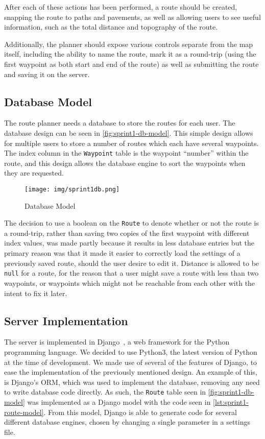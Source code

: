 After each of these actions has been performed, a route should be created, snapping the route to paths and pavements, as well as allowing users to see useful information, such as the total distance and topography of the route.

Additionally, the planner should expose various controls separate from the map itself, including the ability to name the route, mark it as a round-trip (using the first waypoint as both start and end of the route) as well as submitting the route and saving it on the server.

\subsection{Database Model}

The route planner needs a database to store the routes for each user. The database design can be seen in \autoref{fig:sprint1-db-model}. This simple design allows for multiple users to store a number of routes which each have several waypoints. The index column in the \texttt{Waypoint} table is the waypoint ``number'' within the route, and this design allows the database engine to sort the waypoints when they are requested.

\begin{figure}[!ht]
	\centering
	\texttt{[image: img/sprint1db.png]}
	\caption{Database Model}
	\label{fig:sprint1-db-model}
\end{figure}

The decision to use a boolean on the \texttt{Route} to denote whether or not the route is a round-trip, rather than saving two copies of the first waypoint with different index values, was made partly because it results in less database entries but the primary reason was that it made it easier to correctly load the settings of a previously saved route, should the user desire to edit it. Distance is allowed to be \texttt{null} for a route, for the reason that a user might save a route with less than two waypoints, or waypoints which might not be reachable from each other with the intent to fix it later.

\subsection{Server Implementation}

The server is implemented in Django~\citep{djangoproject}, a web framework for the Python programming language. We decided to use Python3, the latest version of Python at the time of development. We made use of several of the features of Django, to ease the implementation of the previously mentioned design. An example of this, is Django's \ac{ORM}, which was used to implement the database, removing any need to write database code directly. As such, the \texttt{Route} table seen in \autoref{fig:sprint1-db-model} was implemented as a Django model with the code seen in \autoref{lst:sprint1-route-model}. From this model, Django is able to generate code for several different database engines, chosen by changing a single parameter in a settings file.

